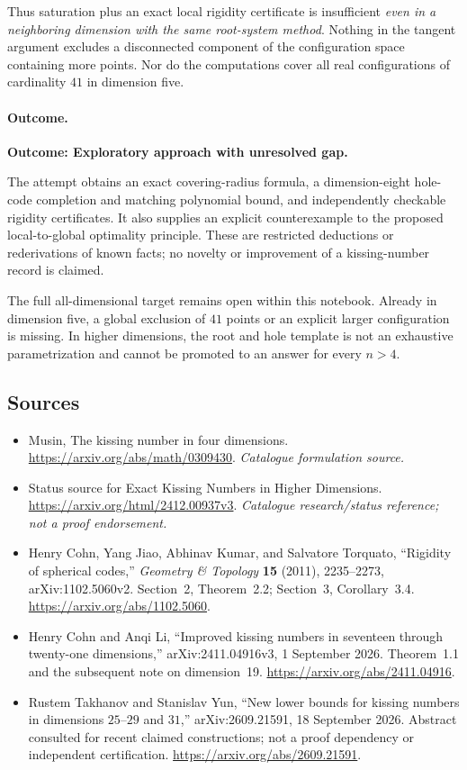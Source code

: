 \documentclass[11pt,a4paper]{article}
\numberwithin{equation}{section}
\begin{document}
Thus saturation plus an exact local rigidity certificate is insufficient
\emph{even in a neighboring dimension with the same root-system method}.
Nothing in the tangent argument excludes a disconnected component of the
configuration space containing more points. Nor do the computations
cover all real configurations of cardinality $41$ in dimension five.

\paragraph{Outcome.}
\textbf{Outcome: Exploratory approach with unresolved gap.}

The attempt obtains an exact covering-radius formula, a dimension-eight
hole-code completion and matching polynomial bound, and independently
checkable rigidity certificates. It also supplies an explicit
counterexample to the proposed local-to-global optimality principle.
These are restricted deductions or rederivations of known facts; no
novelty or improvement of a kissing-number record is claimed.

The full all-dimensional target remains open within this notebook.
Already in dimension five, a global exclusion of $41$ points or an
explicit larger configuration is missing. In higher dimensions, the root
and hole template is not an exhaustive parametrization and cannot be
promoted to an answer for every $n>4$.
\subsection{Sources}
\begin{itemize}\raggedright
\item[\textnormal{[S1]}]\hypertarget{source:110:1}{} Musin, The kissing number in four dimensions.
\url{https://arxiv.org/abs/math/0309430}.
{\small\textit{Catalogue formulation source.}}
\item[\textnormal{[S2]}]\hypertarget{source:110:2}{} Status source for Exact Kissing Numbers in Higher Dimensions.
\url{https://arxiv.org/html/2412.00937v3}.
{\small\textit{Catalogue research/status reference; not a proof endorsement.}}
\item[\textnormal{[E1]}]\hypertarget{extra:110:1}{}
Henry Cohn, Yang Jiao, Abhinav Kumar, and Salvatore Torquato,
``Rigidity of spherical codes,'' \emph{Geometry \& Topology}
\textbf{15} (2011), 2235--2273, arXiv:1102.5060v2.
Section~2, Theorem~2.2; Section~3, Corollary~3.4.
\url{https://arxiv.org/abs/1102.5060}.
\item[\textnormal{[E2]}]\hypertarget{extra:110:2}{}
Henry Cohn and Anqi Li, ``Improved kissing numbers in seventeen through
twenty-one dimensions,'' arXiv:2411.04916v3, 1 September 2026.
Theorem~1.1 and the subsequent note on dimension~19.
\url{https://arxiv.org/abs/2411.04916}.
\item[\textnormal{[E3]}]\hypertarget{extra:110:3}{}
Rustem Takhanov and Stanislav Yun, ``New lower bounds for kissing numbers
in dimensions $25$--$29$ and $31$,'' arXiv:2609.21591,
18 September 2026. Abstract consulted for recent claimed constructions;
not a proof dependency or independent certification.
\url{https://arxiv.org/abs/2609.21591}.
\end{itemize}
\end{document}

